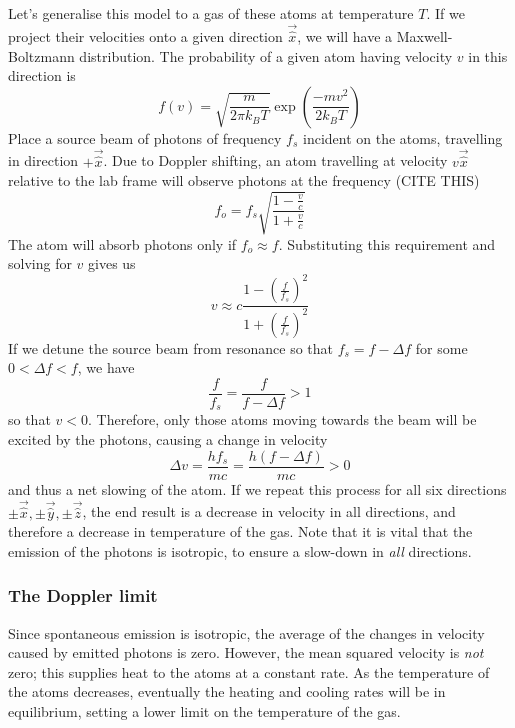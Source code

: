 \documentclass[11pt,twoside,a4paper]{article}
\begin{document}
Let's generalise this model to a gas of these atoms at temperature \(T\). If we project their velocities onto a given direction \(\vec{\hat{x}}\), we will have a Maxwell-Boltzmann distribution. The probability of a given atom having velocity \(v\) in this direction is \cite{muller}
\begin{equation}
    f(v) = \sqrt{\frac{m}{2\pi k_B T}}\exp\left(\frac{-mv^2}{2k_B T}\right)
\end{equation}
Place a source beam of photons of frequency \(f_s\) incident on the atoms, travelling in direction \(+\vec{\hat{x}}\). Due to Doppler shifting, an atom travelling at velocity \(v\vec{\hat{x}}\) relative to the lab frame will observe photons at the frequency (CITE THIS)
\begin{equation}
    f_o =  f_s\sqrt{\frac{1-\frac{v}{c}}{1+\frac{v}{c}}}
\end{equation}
The atom will absorb photons only if \(f_o\approx f\). Substituting this requirement and solving for \(v\) gives us
\begin{equation}
    v\approx c\frac{1-\left(\frac{f}{f_s}\right)^2}{1+\left(\frac{f}{f_s}\right)^2}
\end{equation}
If we detune the source beam from resonance so that \(f_s=f-\Delta f\) for some \(0<\Delta f<f\), we have
\begin{equation}
    \frac{f}{f_s} = \frac{f}{f-\Delta f} > 1
\end{equation}
so that \(v<0\). Therefore, only those atoms moving towards the beam will be excited by the photons, causing a change in velocity
\begin{equation}
    \Delta v=\frac{hf_s}{mc}=\frac{h(f-\Delta f)}{mc}>0
\end{equation}
and thus a net slowing of the atom. If we repeat this process for all six directions \(\pm\vec{\hat{x}},\pm\vec{\hat{y}},\pm\vec{\hat{z}}\), the end result is a decrease in velocity in all directions, and therefore
a decrease in temperature of the gas. Note that it is vital that the emission of the photons is isotropic, to ensure a slow-down in \textit{all} directions.
\subsubsection{The Doppler limit}
Since spontaneous emission is isotropic, the average of the changes in velocity caused by emitted photons is zero. However, the mean squared velocity is \textit{not} zero; this supplies heat to the atoms at a constant rate.
As the temperature of the atoms decreases, eventually the heating and cooling rates will be in equilibrium, setting a lower limit on the temperature of the gas.
\end{document}
